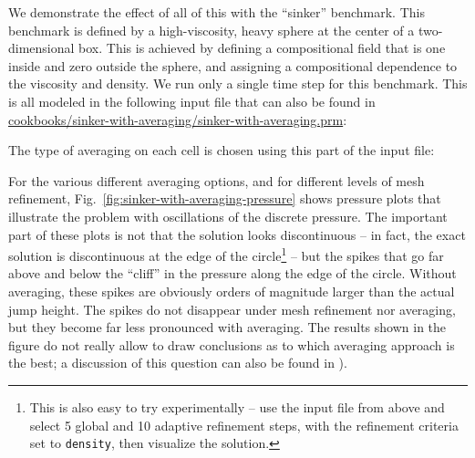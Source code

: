 \documentclass{article}
\begin{document}
We demonstrate the effect of all of this with the ``sinker'' benchmark. This
benchmark is defined by a high-viscosity, heavy sphere at the center of a
two-dimensional box. This is achieved by defining a compositional field that is
one inside and zero outside the sphere, and assigning a compositional dependence
to the viscosity and density. We run only a single time step for this benchmark.
This is all modeled in the following input file that can also be found in
\url{cookbooks/sinker-with-averaging/sinker-with-averaging.prm}:


The type of averaging on each cell is chosen using this part of the input file:

For the various different averaging options, and for different levels of mesh
refinement, Fig.~\ref{fig:sinker-with-averaging-pressure} shows
pressure plots that illustrate the problem with oscillations of the discrete
pressure. The important part of these plots is not that the solution looks
discontinuous -- in fact, the exact solution is discontinuous at the edge of the
circle\footnote{This is also easy to try experimentally -- use the input file
from above and select 5 global and 10 adaptive refinement steps, with the
refinement criteria set to \texttt{density}, then visualize the solution.} --
but the spikes that go far above and below the ``cliff'' in the pressure along
the edge of the circle. Without averaging, these spikes are obviously orders
of magnitude larger than the actual jump height. The spikes do not disappear
under mesh refinement nor averaging, but they become far less pronounced with
averaging. The results shown in the figure do not really allow to draw
conclusions as to which averaging approach is the best; a discussion of this
question can also be found in \cite{Bab08,Deu08,DMGT11,TMK14}).
\end{document}
